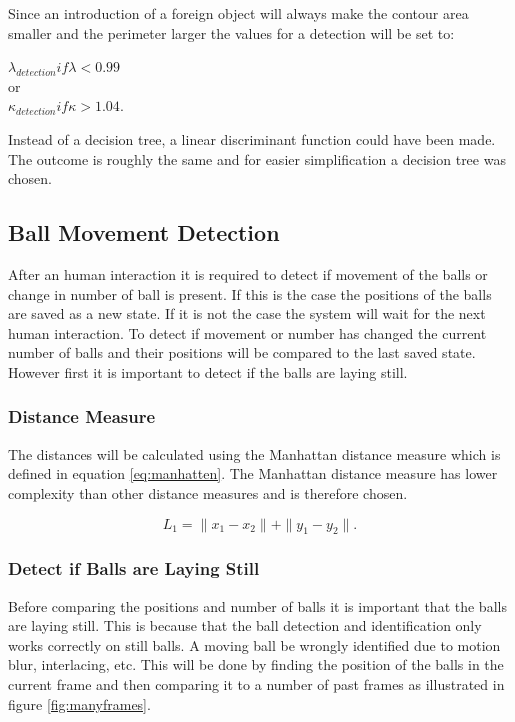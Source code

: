Since an introduction of a foreign object will always make the contour area smaller and the perimeter larger the values for a detection will be set to:

\begin{center}
$\lambda_{detection} if \lambda < 0.99$ \\
or\\
$\kappa_{detection} if \kappa > 1.04$.
\end{center}

Instead of a decision tree, a linear discriminant function could have been made. The outcome is roughly the same and for easier simplification a decision tree was chosen.

\subsection{Ball Movement Detection}
After an human interaction it is required to detect if movement of the balls or change in number of ball is present. If this is the case the 
positions of the balls are saved as a new state. If it is not the case the system will wait for the next human interaction. To detect if movement or number has changed the current number of balls and their positions will be compared to the last saved state. However first it is important to detect if the balls are laying still.

\subsubsection{Distance Measure}
The distances will be calculated using the Manhattan distance measure which is defined in equation \ref{eq:manhatten}. The Manhattan distance measure has lower complexity than other distance measures and is therefore chosen. 

\begin{equation}
L_{1} = \parallel x_{1}-x_{2}\parallel + \parallel y_{1}-y_{2}\parallel.
\label{eq:manhatten}
\end{equation}

\subsubsection{Detect if Balls are Laying Still}
Before comparing the positions and number of balls it is important that the balls are laying still. This is because that the ball detection and identification only works correctly on still balls. A moving ball be wrongly identified due to motion blur, interlacing, etc. This will be done by finding the position of the balls in the current frame and then comparing it to a number of past frames as illustrated in figure \ref{fig:manyframes}.

